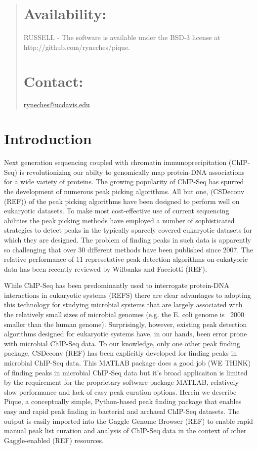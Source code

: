 \documentclass{bioinfo}
\begin{document}
{\begin{abstract}
\section{Availability:} 
RUSSELL - The software is available under the BSD-3 license at http://github.com/ryneches/pique.

\section{Contact:} \href{ryneches@ucdavis.edu}{ryneches@ucdavis.edu}

\end{abstract}

\section{Introduction}
Next generation sequencing coupled with chromatin immunoprecipitation (ChIP-Seq) is revolutionizing our abilty to genomically map protein-DNA associations for a wide variety of proteins.  The growing popularity of ChIP-Seq has spurred the  development of numerous peak picking algorithms.  All but one, (CSDeconv (REF)) of the peak picking algorithms have been designed to perform well on eukaryotic datasets.  To make most cost-effective use of current sequencing abilities the peak picking methods have employed a number of sophisticated strategies to detect peaks in the typically sparcely covered eukaryotic datasets for which they are designed.  The problem of finding peaks in such data is apparently so challenging that over 30 different methods have been published since 2007.  The relative performance of 11 represetative peak detection algorithms on eukatyoric data has been recently reviewed by Wilbanks and Facciotti (REF). 

While ChIP-Seq has been predominantly used to interrogate protein-DNA interactions in eukaryotic systems (REFS) there are clear advantages to adopting this technology for studying microbial systems that are largely associated with the relatively small sizes of microbial genomes (e.g. the E. coli genome is ~2000 smaller than the human genome).  Surprisingly, however, existing peak detection algorithms designed for eukaryotic systems have, in our hands, been error prone with microbial ChIP-Seq data.  To our knowledge, only one other peak finding package, CSDeconv (REF) has been explicitly developed for finding peaks in microbial ChIP-Seq data.  This MATLAB package does a good job (WE THINK) of finding peaks in microbial ChIP-Seq data but it's broad applicaiton is limited by the requirement for the proprietary software package MATLAB, relatively slow performance and lack of easy peak curation options.  Herein we describe Pique, a conceptually simple, Python-based peak finding package that enables easy and rapid peak finding in bacterial and archaeal ChIP-Seq datasets.  The output is easily imported into the Gaggle Genome Browser (REF) to enable rapid manual peak list curation and analysis of ChIP-Seq data in the context of other Gaggle-enabled (REF) resources.  

}
\end{document}
